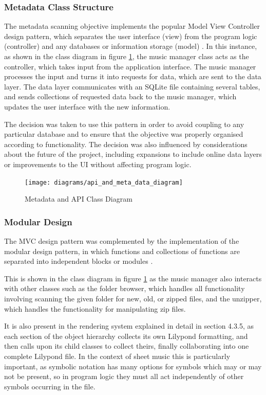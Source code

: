 \subsubsection{Metadata Class Structure}
The metadata scanning objective implements the popular Model View Controller design pattern, which separates the user interface (view) from the program logic (controller) and any databases or information storage (model) \parencite{mvc}.
In this instance, as shown in the class diagram in figure \ref{fig:metadiagram}, the music manager class acts as the controller, which takes input from the application interface. The music manager processes the input and turns it into requests for data, which are sent to the data layer. The data layer communicates with an SQLite file containing several tables, and sends collections of requested data back to the music manager, which updates the user interface with the new information.

The decision was taken to use this pattern in order to avoid coupling to any particular database and to ensure that the objective was properly organised according to functionality. The decision was also influenced by considerations about the future of the project, including expansions to include online data layers or improvements to the UI without affecting program logic.

\begin{figure}[H]
    \centering
    \texttt{[image: diagrams/api\_and\_meta\_data\_diagram]}
    \caption{Metadata and API Class Diagram}
    \label{fig:metadiagram}
\end{figure}

\subsubsection{Modular Design}
The MVC design pattern was complemented by the implementation of the  modular design pattern, in which functions and collections of functions are separated into independent blocks or modules \parencite{modular}.

This is shown in the class diagram in figure \ref{fig:metadiagram} as the music manager also interacts with other classes such as the folder browser, which handles all functionality involving scanning the given folder for new, old, or zipped files, and the unzipper, which handles the functionality for manipulating zip files.

It is also present in the rendering system explained in detail in section 4.3.5, as each section of the object hierarchy collects its own Lilypond formatting, and then calls upon its child classes to collect theirs, finally collaborating into one complete Lilypond file. In the context of sheet music this is particularly important, as symbolic notation has many options for symbols which may or may not be present, so in program logic they must all act independently of other symbols occurring in the file.

